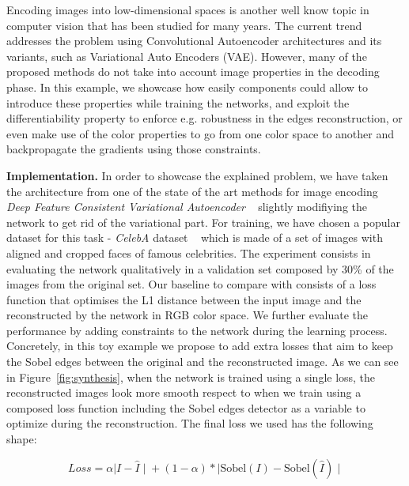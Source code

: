 Encoding images into low-dimensional spaces is another well know topic in computer vision that has been studied for many years. The current trend  addresses the problem using  Convolutional Autoencoder architectures and  its   variants, such as Variational Auto Encoders (VAE). However, many of the proposed methods do not take into account image properties in the decoding phase. In this example, we  showcase how easily \lib{} components could allow to introduce these properties while training the networks, and exploit the differentiability property to enforce e.g. robustness in the edges reconstruction, or even make use of the color properties to go from one color space to another and backpropagate the gradients using those constraints.

\textbf{Implementation.} In order to showcase the explained problem, we have taken the architecture from one of the state of the art methods for image encoding \textit{Deep Feature Consistent Variational Autoencoder} ~\citep{DBLP:journals/corr/HouSSQ16a} slightly modifiying the network to get rid of the variational part. For training, we have chosen a popular dataset for this task - \textit{CelebA} dataset ~\citep{liu2015faceattributes} which is made of a set of images with aligned and cropped faces of famous celebrities. The experiment consists in evaluating the network qualitatively in a validation set composed by 30\% of the images from the original set. Our baseline to compare with consists of a loss function that optimises the L1 distance between the input image and the reconstructed by the network in RGB color space. We further evaluate the performance by adding constraints to the network during the learning process. Concretely, in this toy example we propose to add extra losses that aim  to keep the Sobel edges between the original and the reconstructed image. As we can see in Figure~\ref{fig:synthesis}, when the network is trained using a single loss, the reconstructed images look more smooth respect to when we train using a composed loss function including the Sobel edges detector as a variable to optimize during the reconstruction. The final loss we used has the following shape:

\begin{equation}
    \label{eq:synthesis_loss1}
	Loss = \alpha {\mid I - \hat{I} \mid} + (1 - \alpha) * {\mid \text{Sobel}(I) - \text{Sobel}(\hat{I}) \mid}
\end{equation}

